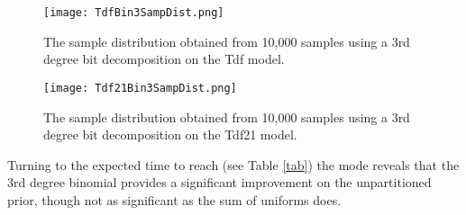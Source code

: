 \begin{figure}[H]
    \centering
    \texttt{[image: TdfBin3SampDist.png]}
    \caption{The sample distribution obtained from 10,000 samples using a 3rd degree bit decomposition on the Tdf model.}
    \label{fig:B3SampDist}
\end{figure}

\begin{figure}[H]
    \centering
    \texttt{[image: Tdf21Bin3SampDist.png]}
    \caption{The sample distribution obtained from 10,000 samples using a 3rd degree bit decomposition on the Tdf21 model.}
    \label{fig:21B3SampDist}
\end{figure}

Turning to the expected time to reach (see Table \ref{tab}) the mode reveals that the 3rd degree binomial provides a significant improvement on the unpartitioned prior, though not as significant as the sum of uniforms does. 


